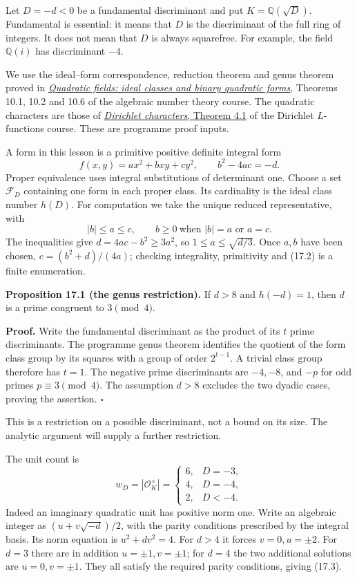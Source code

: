 \documentclass[
  11pt,
  a4paper,
]{article}
\begin{document}
Let \(D=-d<0\) be a fundamental discriminant and put
\(K=\mathbb Q(\sqrt D)\). Fundamental is essential: it means that \(D\)
is the discriminant of the full ring of integers. It does not mean that
\(D\) is always squarefree. For example, the field \(\mathbb Q(i)\) has
discriminant \(-4\).

We use the ideal--form correspondence, reduction theorem and genus
theorem proved in
\href{https://kokunoyumeto.github.io/open-math-courses-public/courses/NT-ANT/quadratic-fields-ideal-classes-and-binary-quadratic-forms.html}{\emph{Quadratic
fields: ideal classes and binary quadratic forms}}, Theorems 10.1, 10.2
and 10.6 of the algebraic number theory course. The quadratic characters
are those of
\href{https://kokunoyumeto.github.io/open-math-courses-public/courses/NT-DIRL/NT-DIRL-01.html\#4-real-characters-and-quadratic-discriminants}{\emph{Dirichlet
characters}, Theorem 4.1} of the Dirichlet \(L\)-functions course. These
are programme proof inputs.

A form in this lesson is a primitive positive definite integral form \[
 f(x,y)=ax^2+bxy+cy^2,\qquad b^2-4ac=-d.
 \tag{17.1}
\] Proper equivalence uses integral substitutions of determinant one.
Choose a set \(\mathcal F_D\) containing one form in each proper class.
Its cardinality is the ideal class number \(h(D)\). For computation we
take the unique reduced representative, with \[
 |b|\le a\le c,\qquad
 b\ge0\ \text{when }|b|=a\text{ or }a=c.
 \tag{17.2}
\] The inequalities give \(d=4ac-b^2\ge3a^2\), so
\(1\le a\le\sqrt{d/3}\). Once \(a,b\) have been chosen,
\(c=(b^2+d)/(4a)\); checking integrality, primitivity and (17.2) is a
finite enumeration.

\textbf{Proposition 17.1 (the genus restriction).} If \(d>8\) and
\(h(-d)=1\), then \(d\) is a prime congruent to \(3\pmod4\).

\textbf{Proof.} Write the fundamental discriminant as the product of its
\(t\) prime discriminants. The programme genus theorem identifies the
quotient of the form class group by its squares with a group of order
\(2^{t-1}\). A trivial class group therefore has \(t=1\). The negative
prime discriminants are \(-4,-8\), and \(-p\) for odd primes
\(p\equiv3\pmod4\). The assumption \(d>8\) excludes the two dyadic
cases, proving the assertion. \(\square\)

This is a restriction on a possible discriminant, not a bound on its
size. The analytic argument will supply a further restriction.

The unit count is \[
 w_D=|\mathcal O_K^\times|=
 \begin{cases}
 6,&D=-3,\\
 4,&D=-4,\\
 2,&D<-4.
 \end{cases}
 \tag{17.3}
\] Indeed an imaginary quadratic unit has positive norm one. Write an
algebraic integer as \((u+v\sqrt{-d})/2\), with the parity conditions
prescribed by the integral basis. Its norm equation is \(u^2+dv^2=4\).
For \(d>4\) it forces \(v=0,u=\pm2\). For \(d=3\) there are in addition
\(u=\pm1,v=\pm1\); for \(d=4\) the two additional solutions are
\(u=0,v=\pm1\). They all satisfy the required parity conditions, giving
(17.3).
\end{document}
